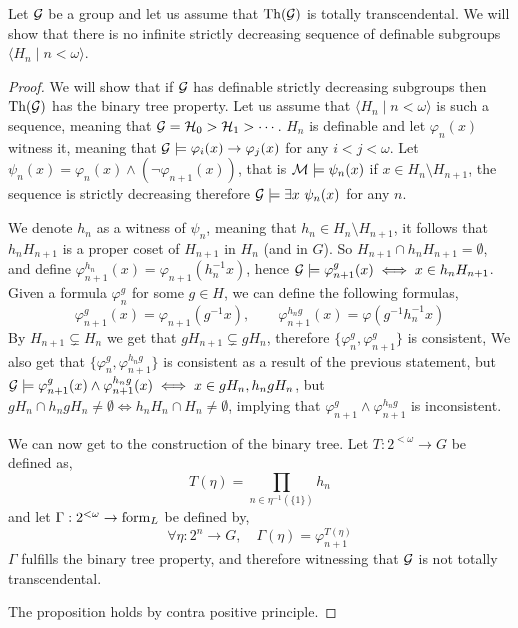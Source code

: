\subquestion{}
Let $\mathcal{G}$ be a group and let us assume that $\operatorname{Th}(\mathcal{G})$ is totally transcendental.
We will show that there is no infinite strictly decreasing sequence of definable subgroups $\langle H_n \mid n < \omega \rangle$.
\begin{proof}
	We will show that if $\mathcal{G}$ has definable strictly decreasing subgroups then $\operatorname{Th}(\mathcal{G})$ has the binary tree property.
	Let us assume that $\langle H_n \mid n < \omega \rangle$ is such a sequence, meaning that $\mathcal{G} = \mathcal{H}_0 > \mathcal{H}_1 > \cdots$.
	$H_n$ is definable and let $\varphi_n(x)$ witness it, meaning that $\mathcal{G} \models \varphi_i(x) \to \varphi_j(x)$ for any $i < j < \omega$.
	Let $\psi_n(x) = \varphi_n(x) \land (\lnot \varphi_{n + 1}(x))$, that is $\mathcal{M} \models \psi_n(x)$ if $x \in H_n \setminus H_{n + 1}$, the sequence is strictly decreasing therefore $\mathcal{G} \models \exists x\ \psi_n(x)$ for any $n$.

	We denote $h_n$ as a witness of $\psi_n$, meaning that $h_n \in H_n \setminus H_{n + 1}$, it follows that $h_n H_{n + 1}$ is a proper coset of $H_{n + 1}$ in $H_n$ (and in $G$).
	So $H_{n + 1} \cap h_n H_{n + 1} = \emptyset$, and define $\varphi_{n + 1}^{h_n}(x) = \varphi_{n + 1}(h_n^{-1} x)$, hence $\mathcal{G} \models \varphi_{n + 1}^g(x) \iff x \in h_n H_{n + 1}$.
	Given a formula $\varphi_n^g$ for some $g \in H$, we can define the following formulas,
	\[
		\varphi_{n + 1}^g(x)
		= \varphi_{n + 1}(g^{-1} x),
		\qquad
		\varphi_{n + 1}^{h_n g}(x)
		= \varphi(g^{-1} h_n^{-1} x)
	\]
	By $H_{n + 1} \subsetneq H_n$ we get that $g H_{n + 1} \subsetneq g H_n$, therefore $\{ \varphi_n^g, \varphi_{n + 1}^g \}$ is consistent,
	We also get that $\{ \varphi_n^g, \varphi_{n + 1}^{h_n g} \}$ is consistent as a result of the previous statement, but $\mathcal{G} \models \varphi_{n + 1}^g(x) \land \varphi_{n + 1}^{h_n g}(x) \iff x \in g H_n, h_n g H_n$,
	but $g H_n \cap h_n g H_n \ne \emptyset \iff h_n H_n \cap H_n \ne \emptyset$, implying that $\varphi_{n + 1}^g \land \varphi_{n + 1}^{h_n g}$ is inconsistent.

	We can now get to the construction of the binary tree.
	Let $T : 2^{< \omega} \to G$ be defined as,
	\[
		T(\eta)
		= \prod_{n \in \eta^{-1}(\{ 1 \})} h_n
	\]
	and let $\Gamma : 2^{< \omega} \to \operatorname{form}_L$ be defined by,
	\[
		\forall \eta : 2^n \to G,
		\quad
		\Gamma(\eta)
		= \varphi_{n + 1}^{T(\eta)}
	\]
	$\Gamma$ fulfills the binary tree property, and therefore witnessing that $\mathcal{G}$ is not totally transcendental.

	The proposition holds by contra positive principle.
\end{proof}

